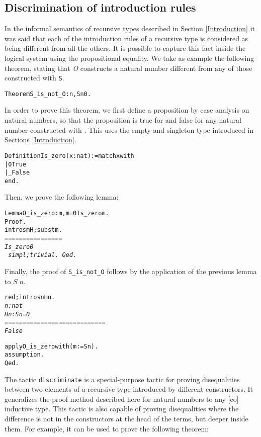 \documentclass[11pt]{article}
\newcommand{\refmancite}[1]{{}}
\begin{document}
\subsection{Discrimination of introduction rules}
\label{Discrimination}

In the informal semantics of recursive types described in Section
\ref{Introduction} it was said that each of the introduction rules of a
recursive type is considered as being different from all the others.
It is possible to capture this fact inside the logical system using
the propositional equality. We take as example the following theorem,
stating that \textsl{O} constructs a natural number different
from any of those constructed with \texttt{S}.

\begin{alltt}
Theorem S_is_not_O : {\prodsym} n, S n {\coqdiff} 0.
\end{alltt}

In order to prove this theorem, we first define a proposition by case
analysis on natural numbers, so that the proposition is true for {\Z}
and false for any natural number constructed with {\SUCC}. This uses
the empty and singleton type introduced in Sections \ref{Introduction}.

\begin{alltt}
Definition Is_zero (x:nat):= match x with
                                     | 0 {\funarrow} True
                                     | _ {\funarrow} False
                             end.
\end{alltt}

\noindent Then, we prove the following lemma:

\begin{alltt}
Lemma O_is_zero : {\prodsym} m, m = 0 {\arrow} Is_zero m.
Proof.
  intros m H; subst m.
\it{}
================
 Is_zero 0
\tt{}
simpl;trivial.
Qed.
\end{alltt}

\noindent Finally, the proof of \texttt{S\_is\_not\_O} follows by the
application of the previous lemma to $S\;n$.


\begin{alltt}

 red; intros n Hn.
 \it{}
  n : nat
  Hn : S n = 0
  ============================
   False \tt

 apply O_is_zero with (m := S n).
 assumption.
Qed.
\end{alltt}


The tactic \texttt{discriminate} \refmancite{Section \ref{Discriminate}} is
a special-purpose tactic for proving disequalities between two
elements of a recursive type introduced by different constructors. It
generalizes the proof method described here for natural numbers to any
[co]-inductive type. This tactic is also capable of proving disequalities
where the difference is not in the constructors at the head of the
terms, but deeper inside them. For example, it can be used to prove
the following theorem:
\end{document}
